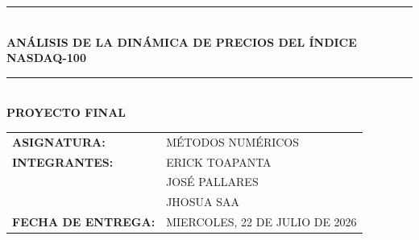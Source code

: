 \thispagestyle{empty}


\vspace*{2cm}
\begin{center}
    \noindent\rule{0.85\textwidth}{0.8pt}\\[0.6cm]
    {\Huge\bfseries ANÁLISIS DE LA DINÁMICA DE PRECIOS DEL ÍNDICE NASDAQ-100}\\[0.3cm]
    \noindent\rule{0.85\textwidth}{0.8pt}\\[2.5cm]
    
    {\Large\bfseries PROYECTO FINAL}\\[4.5cm]
    
    \begin{flushleft}
    \hspace*{1.5cm}
    \begin{tabular}{ll}
        \textbf{ASIGNATURA:} & MÉTODOS NUMÉRICOS \\ [0.6cm]
        \textbf{INTEGRANTES:} & ERICK TOAPANTA \\
                              & JOSÉ PALLARES \\
                              & JHOSUA SAA \\ [0.6cm]
        \textbf{FECHA DE ENTREGA:} & MIERCOLES, 22 DE JULIO DE 2026
    \end{tabular}
    \end{flushleft}
\end{center}
\newpage